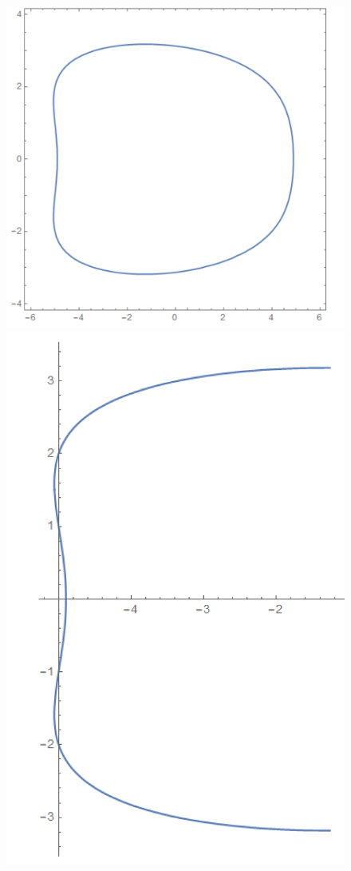 \documentclass{article}
\theoremstyle{definition}
\begin{document}
\begin{figure}[!htb]
    \centering
    \includegraphics[scale=0.25]{eta-1.PNG}
    \raisebox{1.5cm}{\noindent\Huge=}
    \includegraphics[scale=0.22]{eta-2.PNG}

\end{figure}
\end{document}
